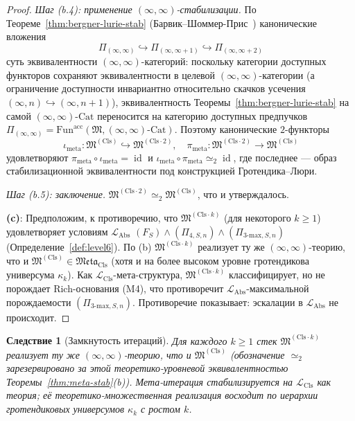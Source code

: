 \documentclass[11pt]{article}
\theoremstyle{plain}
\newtheorem{corollary}[theorem]{Следствие}
\theoremstyle{definition}
\newcommand{\fM}{\mathfrak{M}}
\newcommand{\Meta}{\mathfrak{Meta}}
\newcommand{\LCls}{\mathcal{L}_{\mathrm{Cls}}}
\newcommand{\LAbs}{\mathcal{L}_{\mathrm{Abs}}}
\newcommand{\Fun}{\mathrm{Fun}}
\newcommand{\Cat}{\mathrm{Cat}}
\DeclareMathOperator{\id}{id}
\begin{document}
\begin{proof}
\emph{Шаг (b.4): применение $(\infty, \infty)$-стабилизации.} По Теореме~\ref{thm:bergner-lurie-stab} (Барвик--Шоммер-Прис~\cite{BarwickSchommerPries2021}) канонические вложения
\[ \Pi_{(\infty, \infty)} \hookrightarrow \Pi_{(\infty, \infty + 1)} \hookrightarrow \Pi_{(\infty, \infty + 2)} \]
суть эквивалентности $(\infty, \infty)$-категорий: поскольку категории доступных функторов сохраняют эквивалентности в целевой $(\infty, \infty)$-категории (а ограничение доступности инвариантно относительно скачков усечения $(\infty, n) \hookrightarrow (\infty, n+1)$), эквивалентность Теоремы~\ref{thm:bergner-lurie-stab} на самой $(\infty, \infty)$-$\Cat$ переносится на категорию доступных предпучков $\Pi_{(\infty, \infty)} = \Fun^{\mathrm{acc}}(\fM, (\infty, \infty)\text{-}\Cat)$. Поэтому канонические $2$-функторы
\[ \iota_{\mathrm{meta}} : \fM^{(\mathrm{Cls})} \hookrightarrow \fM^{(\mathrm{Cls}\cdot 2)}, \quad \pi_{\mathrm{meta}} : \fM^{(\mathrm{Cls}\cdot 2)} \to \fM^{(\mathrm{Cls})} \]
удовлетворяют $\pi_{\mathrm{meta}} \circ \iota_{\mathrm{meta}} = \id$ и $\iota_{\mathrm{meta}} \circ \pi_{\mathrm{meta}} \simeq_2 \id$, где последнее — образ стабилизационной эквивалентности под конструкцией Гротендика--Люри.

\emph{Шаг (b.5): заключение.} $\fM^{(\mathrm{Cls}\cdot 2)} \simeq_2 \fM^{(\mathrm{Cls})}$, что и утверждалось.

\textbf{(c)}: Предположим, к противоречию, что $\fM^{(\mathrm{Cls}\cdot k)}$ (для некоторого $k \geq 1$) удовлетворяет условиям $\LAbs$ $(F_S) \wedge (\Pi_{4, S, n}) \wedge (\Pi_{3\text{-max}, S, n})$ (Определение~\ref{def:level6}). По (b) $\fM^{(\mathrm{Cls}\cdot k)}$ реализует ту же $(\infty, \infty)$-теорию, что и $\fM^{(\mathrm{Cls})} \in \Meta_{\mathrm{Cls}}$ (хотя и на более высоком уровне гротендикова универсума $\kappa_k$). Как $\LCls$-мета-структура, $\fM^{(\mathrm{Cls}\cdot k)}$ классифицирует, но не порождает Rich-основания (M4), что противоречит $\LAbs$-максимальной порождаемости $(\Pi_{3\text{-max}, S, n})$. Противоречие показывает: эскалации в $\LAbs$ не происходит.
\end{proof}

\begin{corollary}[Замкнутость итераций]\label{cor:iteration-closure}
Для каждого $k \geq 1$ стек $\fM^{(\mathrm{Cls}\cdot k)}$ реализует ту же $(\infty, \infty)$-теорию, что и $\fM^{(\mathrm{Cls})}$ (обозначение $\simeq_2$ зарезервировано за этой теоретико-уровневой эквивалентностью Теоремы~\ref{thm:meta-stab}(b)). Мета-итерация стабилизируется на $\LCls$ \emph{как теория}; её теоретико-множественная реализация восходит по иерархии гротендиковых универсумов $\kappa_k$ с ростом $k$.
\end{corollary}
\end{document}
